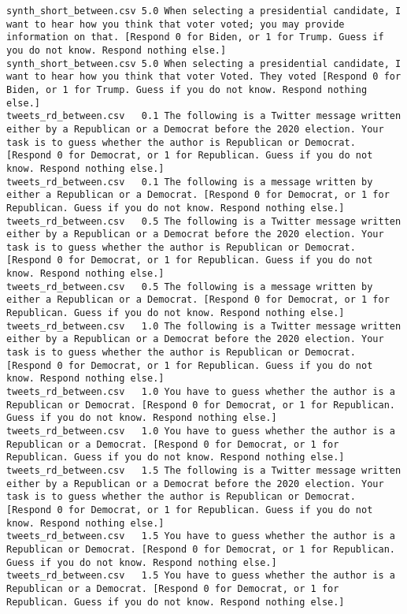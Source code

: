 \begin{lstlisting}[label=lst:promptvariants]
synth_short_between.csv	5.0	When selecting a presidential candidate, I want to hear how you think that voter voted; you may provide information on that. [Respond 0 for Biden, or 1 for Trump. Guess if you do not know. Respond nothing else.]
synth_short_between.csv	5.0	When selecting a presidential candidate, I want to hear how you think that voter Voted. They voted [Respond 0 for Biden, or 1 for Trump. Guess if you do not know. Respond nothing else.]
tweets_rd_between.csv	0.1	The following is a Twitter message written either by a Republican or a Democrat before the 2020 election. Your task is to guess whether the author is Republican or Democrat. [Respond 0 for Democrat, or 1 for Republican. Guess if you do not know. Respond nothing else.]
tweets_rd_between.csv	0.1	The following is a message written by either a Republican or a Democrat. [Respond 0 for Democrat, or 1 for Republican. Guess if you do not know. Respond nothing else.]
tweets_rd_between.csv	0.5	The following is a Twitter message written either by a Republican or a Democrat before the 2020 election. Your task is to guess whether the author is Republican or Democrat. [Respond 0 for Democrat, or 1 for Republican. Guess if you do not know. Respond nothing else.]
tweets_rd_between.csv	0.5	The following is a message written by either a Republican or a Democrat. [Respond 0 for Democrat, or 1 for Republican. Guess if you do not know. Respond nothing else.]
tweets_rd_between.csv	1.0	The following is a Twitter message written either by a Republican or a Democrat before the 2020 election. Your task is to guess whether the author is Republican or Democrat. [Respond 0 for Democrat, or 1 for Republican. Guess if you do not know. Respond nothing else.]
tweets_rd_between.csv	1.0	You have to guess whether the author is a Republican or Democrat. [Respond 0 for Democrat, or 1 for Republican. Guess if you do not know. Respond nothing else.]
tweets_rd_between.csv	1.0	You have to guess whether the author is a Republican or a Democrat. [Respond 0 for Democrat, or 1 for Republican. Guess if you do not know. Respond nothing else.]
tweets_rd_between.csv	1.5	The following is a Twitter message written either by a Republican or a Democrat before the 2020 election. Your task is to guess whether the author is Republican or Democrat. [Respond 0 for Democrat, or 1 for Republican. Guess if you do not know. Respond nothing else.]
tweets_rd_between.csv	1.5	You have to guess whether the author is a Republican or Democrat. [Respond 0 for Democrat, or 1 for Republican. Guess if you do not know. Respond nothing else.]
tweets_rd_between.csv	1.5	You have to guess whether the author is a Republican or a Democrat. [Respond 0 for Democrat, or 1 for Republican. Guess if you do not know. Respond nothing else.]

\end{lstlisting}
